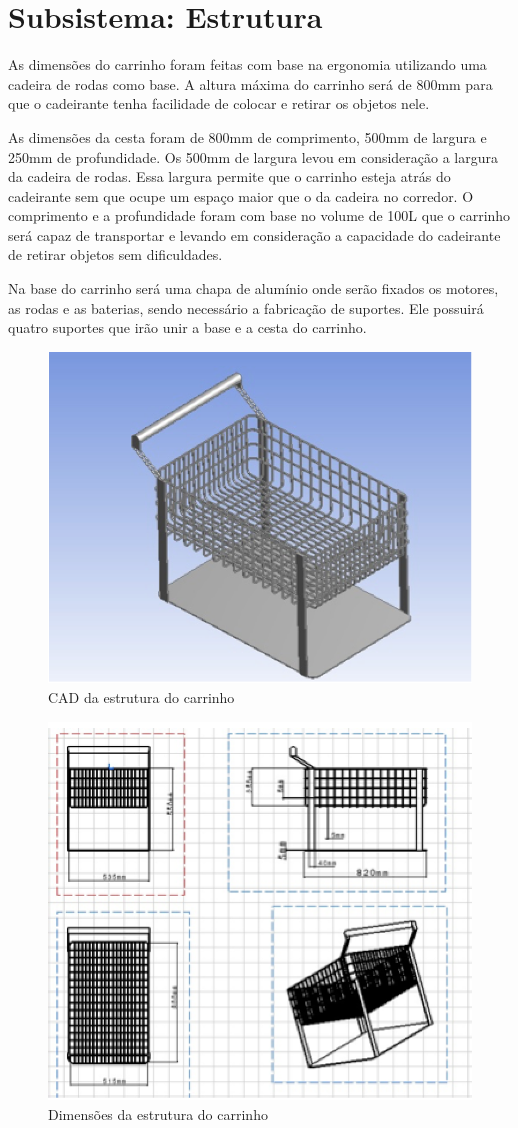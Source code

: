\section{Subsistema: Estrutura}
As dimensões do carrinho foram feitas com base na ergonomia utilizando uma cadeira de rodas como base. A altura máxima do carrinho será de 800mm para que o cadeirante tenha facilidade de colocar e retirar os objetos nele.

\par As dimensões da cesta foram de 800mm de comprimento, 500mm de largura e 250mm de profundidade. Os 500mm de largura levou em consideração a largura da cadeira de rodas. Essa largura permite que o carrinho esteja atrás do cadeirante sem que ocupe um espaço maior que o da cadeira no corredor. O comprimento e a profundidade foram com base no volume de 100L que o carrinho será capaz de transportar e levando em consideração a capacidade do cadeirante de retirar objetos sem dificuldades.

\par Na base do carrinho será uma chapa de alumínio onde serão fixados os motores, as rodas e as baterias, sendo necessário a fabricação de suportes. Ele possuirá quatro suportes que irão unir a base e a cesta do carrinho.

 \begin{figure}[ht]
		\centering
		\includegraphics[width=.4\textwidth]{figuras/CADcarrinho.png}
		\caption{CAD da estrutura do carrinho}
		\label{fig:CADcarrinho}
	\end{figure} 
    
 \begin{figure}[ht]
		\centering
		\includegraphics[width=.4\textwidth]{figuras/estrutura.png}
		\caption{Dimensões da estrutura do carrinho}
		\label{fig:estrutura}
	\end{figure} 

